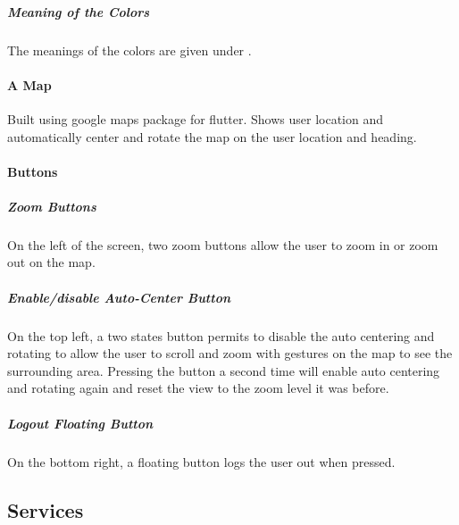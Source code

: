 \documentclass[letterpaper,10pt,english]{sphinxmanual}
\begin{document}
\subparagraph{Meaning of the Colors}
\label{\detokenize{microservices/driver_app/screens:meaning-of-the-colors}}
The meanings of the colors are given under {\hyperref[\detokenize{taxonomy_serialization:traffic-light-value}]{}}.


\paragraph{A Map}
\label{\detokenize{microservices/driver_app/screens:a-map}}
Built using google maps package for flutter.
Shows user location and automatically center and rotate the map on the user location and heading.


\paragraph{Buttons}
\label{\detokenize{microservices/driver_app/screens:buttons}}

\subparagraph{Zoom Buttons}
\label{\detokenize{microservices/driver_app/screens:zoom-buttons}}
On the left of the screen, two zoom buttons allow the user to zoom in or zoom out on the map.


\subparagraph{Enable/disable Auto-Center Button}
\label{\detokenize{microservices/driver_app/screens:enable-disable-auto-center-button}}
On the top left, a two states button permits to disable the auto centering and rotating to allow the user to scroll and zoom with gestures on the map to see the surrounding area.
Pressing the button a second time will enable auto centering and rotating again and reset the view to the zoom level it was before.


\subparagraph{Logout Floating Button}
\label{\detokenize{microservices/driver_app/screens:logout-floating-button}}
On the bottom right, a floating button logs the user out when pressed.


\subsection{Services}
\label{\detokenize{microservices/driver_app/services:services}}\label{\detokenize{microservices/driver_app/services::doc}}
\end{document}

